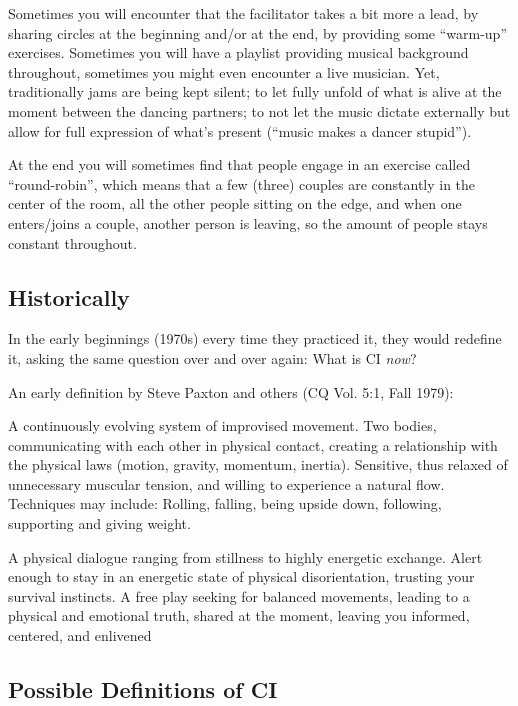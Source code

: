 Sometimes you will encounter that the facilitator takes a bit more a lead, by sharing circles at the beginning and/or at the end, by providing some ``warm-up'' exercises.
Sometimes you will have a playlist providing musical background throughout, sometimes you might even encounter a live musician.
Yet, traditionally jams are being kept silent; to let fully unfold of what is alive at the moment between the dancing partners; to not let the music dictate externally but allow for full expression of what's present (``music makes a dancer stupid'').

At the end you will sometimes find that people engage in an exercise called ``round-robin'', which means that a few (three) couples are constantly in the center of the room, all the other people sitting on the edge, and when one enters/joins a couple, another person is leaving, so the amount of people stays constant throughout.

\subsection{Historically}\label{subsec:historically}

In the early beginnings (1970s) every time they practiced it, they would redefine it, asking the same question over and over again: What is CI \textit{now}?

An early definition by Steve Paxton and others (CQ Vol. 5:1, Fall 1979):

A continuously evolving system of improvised movement.
Two bodies, communicating with each other in physical contact, creating a relationship with the physical laws (motion, gravity, momentum, inertia).
Sensitive, thus relaxed of unnecessary muscular tension, and willing to experience a natural flow.
Techniques may include: Rolling, falling, being upside down, following, supporting and giving weight.

A physical dialogue ranging from stillness to highly energetic exchange.
Alert enough to stay in an energetic state of physical disorientation, trusting your survival instincts.
A free play seeking for balanced movements, leading to a physical and emotional truth, shared at the moment, leaving you informed, centered, and enlivened

\subsection{Possible Definitions of CI}\label{subsec:possible-definitions-of-ci}

